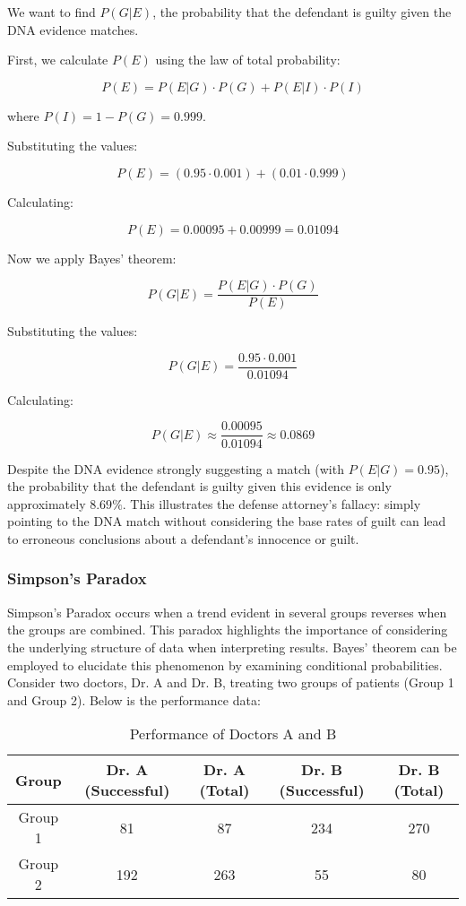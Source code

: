 We want to find \( P(G|E) \), the probability that the defendant is guilty given the DNA evidence matches.

First, we calculate \( P(E) \) using the law of total probability:

\[
P(E) = P(E|G) \cdot P(G) + P(E|I) \cdot P(I)
\]

where \( P(I) = 1 - P(G) = 0.999 \).

Substituting the values:

\[
P(E) = (0.95 \cdot 0.001) + (0.01 \cdot 0.999)
\]

Calculating:

\[
P(E) = 0.00095 + 0.00999 = 0.01094
\]

Now we apply Bayes' theorem:

\[
P(G|E) = \frac{P(E|G) \cdot P(G)}{P(E)}
\]

Substituting the values:

\[
P(G|E) = \frac{0.95 \cdot 0.001}{0.01094}
\]

Calculating:

\[
P(G|E) \approx \frac{0.00095}{0.01094} \approx 0.0869
\]

Despite the DNA evidence strongly suggesting a match (with \( P(E|G) = 0.95 \)), the probability that the defendant is guilty given this evidence is only approximately \( 8.69\% \). This illustrates the defense attorney's fallacy: simply pointing to the DNA match without considering the base rates of guilt can lead to erroneous conclusions about a defendant's innocence or guilt.

\subsubsection{Simpson's Paradox}

Simpson's Paradox occurs when a trend evident in several groups reverses when the groups are combined. This paradox highlights the importance of considering the underlying structure of data when interpreting results. Bayes' theorem can be employed to elucidate this phenomenon by examining conditional probabilities.\\

Consider two doctors, Dr. A and Dr. B, treating two groups of patients (Group 1 and Group 2). Below is the performance data: \\

\begin{table}[h]
    \centering
    \begin{tabular}{|c|c|c|c|c|}
        \hline
        \textbf{Group} & \textbf{Dr. A (Successful)} & \textbf{Dr. A (Total)} & \textbf{Dr. B (Successful)} & \textbf{Dr. B (Total)} \\
        \hline
        Group 1 & 81 & 87 & 234 & 270 \\
        Group 2 & 192 & 263 & 55 & 80 \\
        \hline
    \end{tabular}
    \caption{Performance of Doctors A and B}
\end{table}

